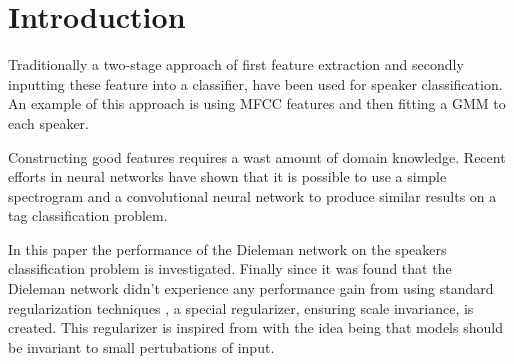 \section{Introduction}

Traditionally a two-stage approach of first feature extraction and secondly inputting these feature into a classifier, have been used for speaker classification. An example of this approach is using MFCC features and then fitting a GMM to each speaker.

Constructing good features requires a wast amount of domain knowledge. Recent efforts  in neural networks\cite{dieleman} have shown that it is possible to use a simple spectrogram and a convolutional neural network to produce similar results on a tag classification problem.

In this paper the performance of the Dieleman network\cite{dieleman} on the speakers classification problem is investigated. Finally since it was found that the Dieleman network didn't experience any performance gain from using standard regularization techniques \cite{dieleman}, a special regularizer, ensuring scale invariance, is created. This regularizer is inspired from \cite{scale-invariante} with the idea being that models should be invariant to small pertubations of input.

